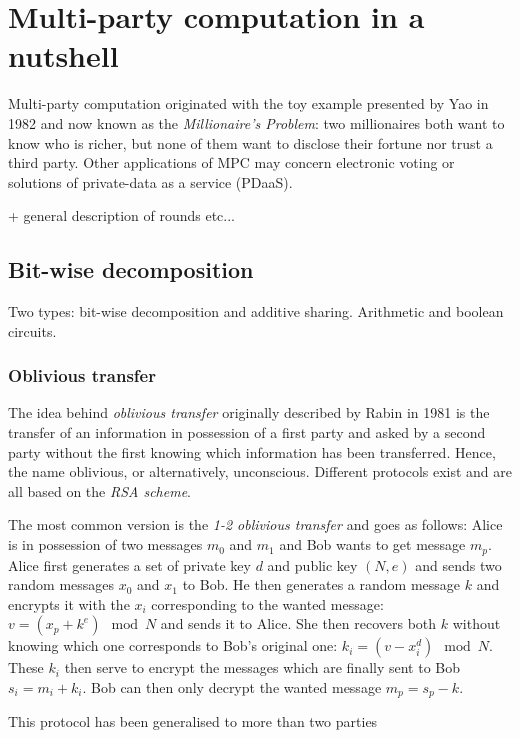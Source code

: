 \section{Multi-party computation in a nutshell}
Multi-party computation originated with the toy example presented by Yao in 1982 \cite{Yao1982ProtocolsComputations} and now known as the \emph{Millionaire's Problem}: two millionaires both want to know who is richer, but none of them want to disclose their fortune nor trust a third party. Other applications of MPC may concern electronic voting or solutions of private-data as a service (PDaaS).

+ general description of rounds etc...

\subsection{Bit-wise decomposition}
Two types: bit-wise decomposition and additive sharing. Arithmetic and boolean circuits.

\subsubsection{Oblivious transfer}
The idea behind \emph{oblivious transfer} originally described by Rabin in 1981 \cite{Rabin1981HowTransfer.} is the transfer of an information in possession of a first party and asked by a second party without the first knowing which information has been transferred. Hence, the name oblivious, or alternatively, unconscious. Different protocols exist and are all based on the \emph{RSA scheme}. 

The most common version is the \emph{1-2 oblivious transfer} \cite{Even1985AContracts} and goes as follows: Alice is in possession of two messages $m_0$ and $m_1$ and Bob wants to get message $m_p$. Alice first generates a set of private key $d$ and public key $(N,e)$ and sends two random messages $x_0$ and $x_1$ to Bob. He then generates a random message $k$ and encrypts it with the $x_i$ corresponding to the wanted message: $v = \left(x_p + k^e\right) \mod N$ and sends it to Alice. She then recovers both $k$ without knowing which one corresponds to Bob's original one: $k_i = \left(v-x_i^d\right) \mod N$. These $k_i$ then serve to encrypt the messages which are finally sent to Bob $s_i = m_i+k_i$. Bob can then only decrypt the wanted message $m_p = s_p-k$. 

This protocol has been generalised to more than two parties \cite{Ishai1997PrivateApplications,Shankar2008AlternativeTransfer,Tassa2011GeneralizedSharing}

